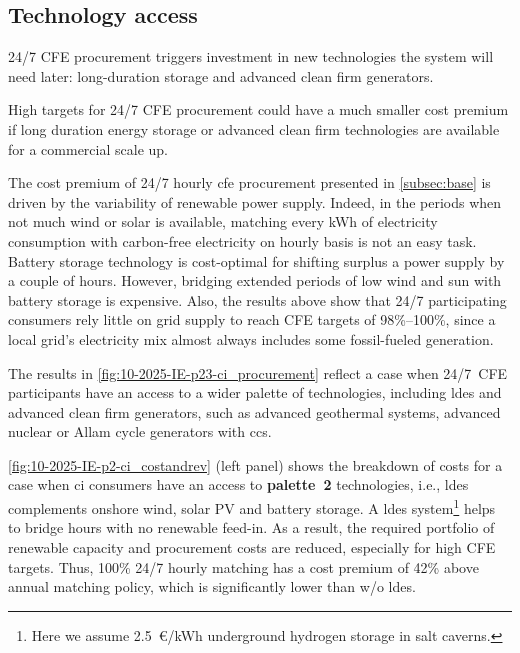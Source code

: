 \subsection{Technology access}
\label{subsec:palette}

\vspace{10pt}
\begin{res}
    24/7 CFE procurement triggers investment in new technologies the system will need later: long-duration storage and advanced clean firm generators.
\end{res}

\vspace*{5pt}
\begin{res}
    High targets for 24/7 CFE procurement could have a much smaller cost premium if long duration energy storage or advanced clean firm technologies are available for a commercial scale up.
\end{res}

The cost premium of 24/7 hourly \gls{cfe} procurement presented in \cref{subsec:base} is driven by the variability of renewable power supply.
Indeed, in the periods when not much wind or solar is available, matching every kWh of electricity consumption with carbon-free electricity on hourly basis is not an easy task.
Battery storage technology is cost-optimal for shifting surplus a power supply by a couple of hours.
However, bridging extended periods of low wind and sun with battery storage is expensive.
Also, the results above show that 24/7 participating consumers rely little on grid supply to reach CFE targets of 98\%--100\%, since a local grid's electricity mix almost always includes some fossil-fueled generation.

The results in \cref{fig:10-2025-IE-p23-ci_procurement} reflect a case when 24/7~CFE participants have an access to a wider palette of technologies, including \gls{ldes} and advanced clean firm generators, such as advanced geothermal systems, advanced nuclear or Allam cycle generators with \gls{ccs}.

\cref{fig:10-2025-IE-p2-ci_costandrev} (left panel) shows the breakdown of costs for a case when \gls{ci} consumers have an access to \textbf{palette~2} technologies, i.e., \gls{ldes} complements onshore wind, solar PV and battery storage.
A \gls{ldes} system\footnote{Here we assume 2.5~\euro/kWh underground hydrogen storage in salt caverns.} helps to bridge hours with no renewable feed-in. 
As a result, the required portfolio of renewable capacity and procurement costs are reduced, especially for high CFE targets.
Thus, 100\% 24/7 hourly matching has a cost premium of 42\% above annual matching policy, which is significantly lower than w/o \gls{ldes}.

